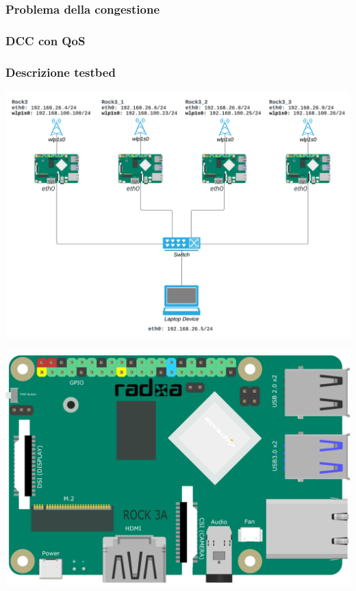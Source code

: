 \documentclass{beamer}
\begin{document}
\begin{frame}
    \frametitle{Problema della congestione}
\end{frame}

\begin{frame}
    \frametitle{DCC con QoS}
\end{frame}

\begin{frame}
    \frametitle{Descrizione testbed}
    \centering
    \begin{minipage}{0.6\textwidth}
        \includegraphics[width=\textwidth]{topology.png}
    \end{minipage}
    \hfill
    \begin{minipage}{0.35\textwidth}
        \centering
        \includegraphics[width=\textwidth]{ROCK_3A.png}

\end{minipage}
\end{frame}
\end{document}
